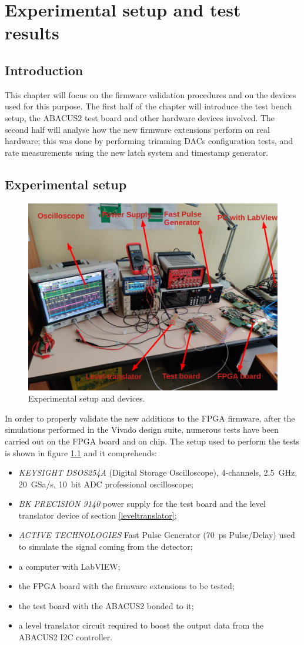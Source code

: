 \chapter{Experimental setup and test results}
\section{Introduction}
This chapter will focus on the firmware validation procedures and on the devices used for this purpose.
The first half of the chapter will introduce the test bench setup, the ABACUS2 test board and other hardware devices involved.
The second half will analyse how the new firmware extensions perform on real hardware; this was done by performing trimming DACs configuration tests, and rate measurements using the new latch system and timestamp generator.

\section{Experimental setup}\label{testbench}
\begin{figure}[H]
	\centering
	\includegraphics[width=0.7\linewidth]{IMG/ch5/TESTBENCH}
	\caption{Experimental setup and devices.}
	\label{fig:testbench}
\end{figure}
In order to properly validate the new additions to the FPGA firmware, after the simulations performed in the Vivado design suite, numerous tests have been carried out on the FPGA board and on chip.
The setup used to perform the tests is shown in figure \ref{fig:testbench} and it comprehends:
\begin{itemize}
	\item \textit{KEYSIGHT DSOS254A} (Digital Storage Oscilloscope), 4-channels, 2.5~GHz, 20~GSa/s, 10~bit ADC professional oscilloscope;
	\item \textit{BK PRECISION 9140} power supply for the test board and the level translator device of section \ref{leveltranslator};
	\item \textit{ACTIVE TECHNOLOGIES} Fast Pulse Generator (70~ps Pulse/Delay) used to simulate the signal coming from the detector;
	\item a computer with LabVIEW;
	\item the FPGA board with the firmware extensions to be tested;
	\item the test board with the ABACUS2 bonded to it;
	\item a level translator circuit required to boost the output data from the ABACUS2 I2C controller.
\end{itemize}

